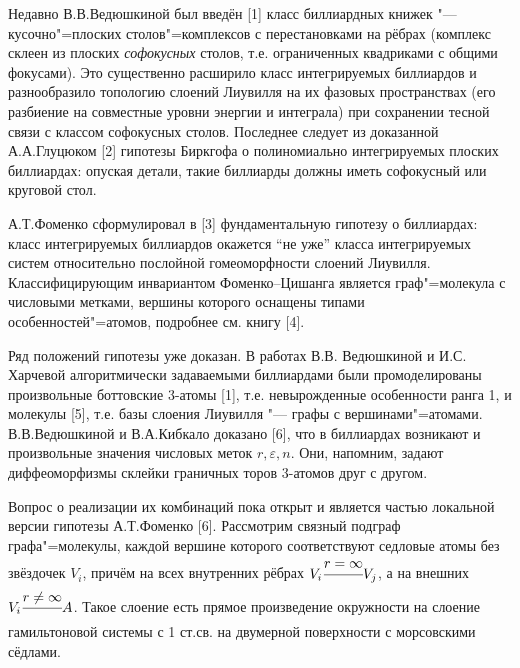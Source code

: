 
\vzmscaption

Недавно В.В.Ведюшкиной был введён [1] класс биллиардных книжек "--- кусочно"=плоских столов"=комплексов с перестановками на рёбрах (комплекс склеен из плоских \textit{софокусных} столов, т.е. ограниченных квадриками с общими фокусами). Это существенно расширило класс интегрируемых биллиардов и разнообразило топологию слоений Лиувилля на их фазовых пространствах (его разбиение на совместные уровни энергии и интеграла) при сохранении тесной связи с классом софокусных столов. Последнее следует из доказанной А.А.Глуцюком [2] гипотезы Биркгофа о полиномиально интегрируемых плоских биллиардах: опуская детали, такие биллиарды должны иметь софокусный или круговой стол.

А.Т.Фоменко сформулировал в [3] фундаментальную гипотезу о биллиардах: класс интегрируемых биллиардов окажется ``не уже'' класса интегрируемых систем относительно послойной гомеоморфности слоений Лиувилля. Классифицирующим инвариантом Фоменко--Цишанга является граф"=молекула с числовыми метками, вершины которого оснащены типами особенностей"=атомов, подробнее см. книгу [4].

Ряд положений гипотезы уже доказан. В работах В.В. Ведюшкиной и И.С. Харчевой алгоритмически задаваемыми биллиардами были промоделированы произвольные боттовские 3-атомы [1], т.е. невырожденные особенности ранга 1, и молекулы [5], т.е. базы слоения Лиувилля "--- графы с вершинами"=атомами. В.В.Ведюшкиной и В.А.Кибкало доказано [6], что в биллиардах возникают и произвольные значения числовых меток $r, \varepsilon, n$. Они, напомним, задают диффеоморфизмы склейки граничных торов 3-атомов друг с другом.

Вопрос о реализации их комбинаций пока открыт и является частью локальной версии гипотезы А.Т.Фоменко [6]. Рассмотрим связный подграф графа"=молекулы, каждой вершине которого соответствуют седловые атомы без звёздочек $V_i$, причём на всех внутренних рёбрах $V_i \cfrac{r = \infty}{}V_j$, а на внешних $V_i \cfrac{r \ne \infty}{}A$. Такое слоение есть прямое произведение окружности на слоение гамильтоновой системы с 1 ст.св. на двумерной поверхности с морсовскими сёдлами.

